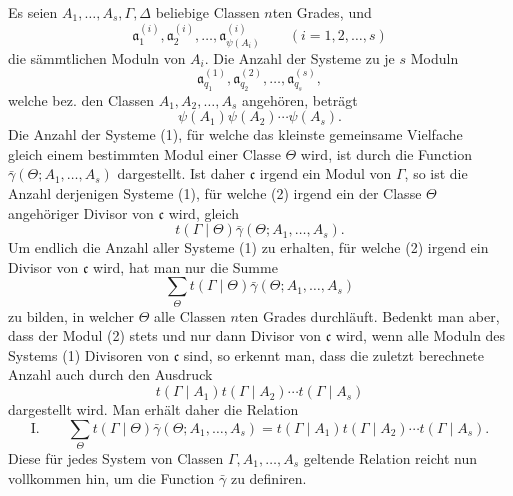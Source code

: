 \documentclass[11pt,a4paper]{article}
\begin{document}
Es seien $A_1,\ldots,A_s,\Gamma,\Delta$ beliebige Classen $n$ten Grades, und
\[
 \mathfrak a^{(i)}_1,\mathfrak a^{(i)}_2,\ldots,
 \mathfrak a^{(i)}_{\psi(A_i)}\qquad (i=1,2,\ldots,s)
\]
die sämmtlichen Moduln von $A_i$. Die Anzahl der Systeme zu je $s$ Moduln
\begin{equation}
 \mathfrak a^{(1)}_{q_1},\mathfrak a^{(2)}_{q_2},\ldots,
 \mathfrak a^{(s)}_{q_s},
\tag{1}
\end{equation}
welche bez. den Classen $A_1,A_2,\ldots,A_s$ angehören, beträgt
\[
 \psi(A_1)\psi(A_2)\cdots\psi(A_s).
\]
Die Anzahl der Systeme (1), für welche das kleinste gemeinsame Vielfache
\begin{equation}
 [\mathfrak a^{(1)}_{q_1},\mathfrak a^{(2)}_{q_2},\ldots,
 \mathfrak a^{(s)}_{q_s}]
\tag{2}
\end{equation}
gleich einem bestimmten Modul einer Classe $\Theta$ wird, ist durch die Function
$\bar\gamma(\Theta;A_1,\ldots,A_s)$ dargestellt. Ist daher $\mathfrak c$ irgend ein Modul von $\Gamma$, so ist die Anzahl derjenigen Systeme (1), für welche (2) irgend ein der Classe $\Theta$ angehöriger Divisor von $\mathfrak c$ wird, gleich
\[
 t(\Gamma\mid\Theta)\bar\gamma(\Theta;A_1,\ldots,A_s).
\]
Um endlich die Anzahl aller Systeme (1) zu erhalten, für welche (2) irgend ein Divisor von $\mathfrak c$ wird, hat man nur die Summe
\[
 \sum_{\Theta}t(\Gamma\mid\Theta)\bar\gamma(\Theta;A_1,\ldots,A_s)
\]
zu bilden, in welcher $\Theta$ alle Classen $n$ten Grades durchläuft. Bedenkt man aber, dass der Modul (2) stets und nur dann Divisor von $\mathfrak c$ wird, wenn alle Moduln des Systems (1) Divisoren von $\mathfrak c$ sind, so erkennt man, dass die zuletzt berechnete Anzahl auch durch den Ausdruck
\[
 t(\Gamma\mid A_1)t(\Gamma\mid A_2)\cdots t(\Gamma\mid A_s)
\]
dargestellt wird. Man erhält daher die Relation
\[
\text{I.}\qquad
 \sum_{\Theta}t(\Gamma\mid\Theta)\bar\gamma(\Theta;A_1,\ldots,A_s)
 =t(\Gamma\mid A_1)t(\Gamma\mid A_2)\cdots t(\Gamma\mid A_s).
\]
Diese für jedes System von Classen $\Gamma,A_1,\ldots,A_s$ geltende Relation reicht nun vollkommen hin, um die Function $\bar\gamma$ zu definiren.
\end{document}
